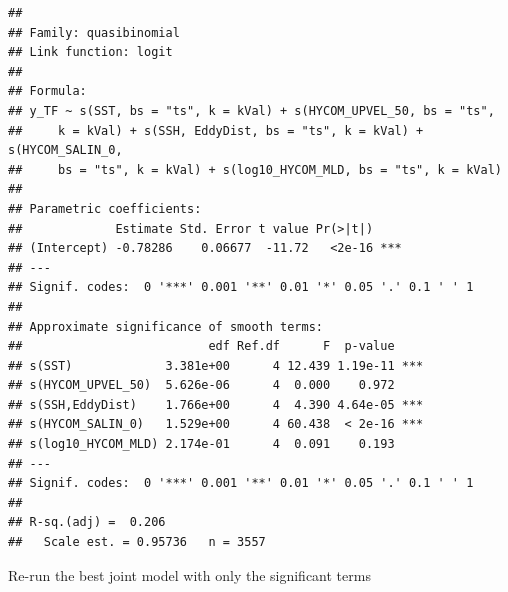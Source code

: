 \documentclass[11pt,]{article}
\newenvironment{Shaded}{\begin{snugshade}}{\end{snugshade}}
\newcommand{\KeywordTok}[1]{\textcolor[rgb]{0.13,0.29,0.53}{\textbf{{#1}}}}
\newcommand{\DataTypeTok}[1]{\textcolor[rgb]{0.13,0.29,0.53}{{#1}}}
\newcommand{\DecValTok}[1]{\textcolor[rgb]{0.00,0.00,0.81}{{#1}}}
\newcommand{\StringTok}[1]{\textcolor[rgb]{0.31,0.60,0.02}{{#1}}}
\newcommand{\NormalTok}[1]{{#1}}
\begin{document}
\begin{verbatim}
## 
## Family: quasibinomial 
## Link function: logit 
## 
## Formula:
## y_TF ~ s(SST, bs = "ts", k = kVal) + s(HYCOM_UPVEL_50, bs = "ts", 
##     k = kVal) + s(SSH, EddyDist, bs = "ts", k = kVal) + s(HYCOM_SALIN_0, 
##     bs = "ts", k = kVal) + s(log10_HYCOM_MLD, bs = "ts", k = kVal)
## 
## Parametric coefficients:
##             Estimate Std. Error t value Pr(>|t|)    
## (Intercept) -0.78286    0.06677  -11.72   <2e-16 ***
## ---
## Signif. codes:  0 '***' 0.001 '**' 0.01 '*' 0.05 '.' 0.1 ' ' 1
## 
## Approximate significance of smooth terms:
##                          edf Ref.df      F  p-value    
## s(SST)             3.381e+00      4 12.439 1.19e-11 ***
## s(HYCOM_UPVEL_50)  5.626e-06      4  0.000    0.972    
## s(SSH,EddyDist)    1.766e+00      4  4.390 4.64e-05 ***
## s(HYCOM_SALIN_0)   1.529e+00      4 60.438  < 2e-16 ***
## s(log10_HYCOM_MLD) 2.174e-01      4  0.091    0.193    
## ---
## Signif. codes:  0 '***' 0.001 '**' 0.01 '*' 0.05 '.' 0.1 ' ' 1
## 
## R-sq.(adj) =  0.206   
##   Scale est. = 0.95736   n = 3557
\end{verbatim}

Re-run the best joint model with only the significant terms

\begin{Shaded}
\end{Shaded}
\end{document}
